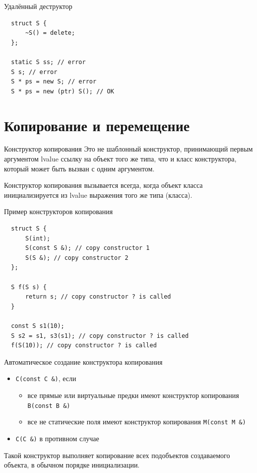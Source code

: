 \documentclass[unknownkeysallowed,xcolor=table]{beamer}
\begin{document}
\begin{frame}{Удалённый деструктор}
  \begin{lstlisting}
  struct S {
      ~S() = delete;
  };

  static S ss; // error
  S s; // error
  S * ps = new S; // error
  S * ps = new (ptr) S(); // OK
  \end{lstlisting}
\end{frame}


\section{Копирование и перемещение}

\begin{frame}{Конструктор копирования}
  Это не шаблонный конструктор, принимающий первым аргументом lvalue ссылку на объект того же типа, что и класс конструктора, который может быть вызван с одним аргументом.

  \vspace{1em}

  Конструктор копирования вызывается всегда, когда объект класса инициализируется из lvalue выражения того же типа (класса).
\end{frame}

\begin{frame}[fragile]{Пример конструкторов копирования}
  \begin{lstlisting}
  struct S {
      S(int);
      S(const S &); // copy constructor 1
      S(S &); // copy constructor 2
  };

  S f(S s) {
      return s; // copy constructor ? is called
  }

  const S s1(10);
  S s2 = s1, s3(s1); // copy constructor ? is called
  f(S(10)); // copy constructor ? is called
  \end{lstlisting}
\end{frame}

\begin{frame}{Автоматическое создание конструктора копирования}
  \begin{itemize}
    \item \lstinline{C(const C &)}, если
      \begin{itemize}
        \item все прямые или виртуальные предки имеют конструктор копирования \lstinline{B(const B &)}
        \item все не статические поля имеют конструктор копирования \lstinline{M(const M &)}
      \end{itemize}
    \item \lstinline{C(C &)} в противном случае
  \end{itemize}

  \vspace{1em}

  Такой конструктор выполняет копирование всех подобъектов создаваемого объекта, в обычном порядке инициализации.
\end{frame}
\end{document}
